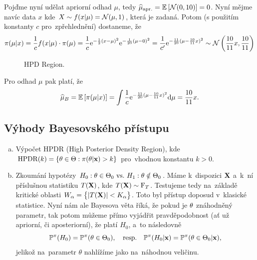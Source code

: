 \begin{example}
\begin{enumerate}[a)]
	
	Pojďme nyní udělat apriorní odhad $\mu$, tedy $\widehat{\mu}_{\mathrm{apr.}}=\mathbb{E}\left[ \mathcal{N}(0,10) \right]=0$. Nyní mějme navíc data $x$ kde $X\sim f(x|\mu)=\mathcal{N}(\mu,1)$, která je zadaná. Potom (s použitím konstanty $c$ pro~zpřehlednění) dostaneme, že
	$$ \pi(\mu|x)=\frac{1}{c}f(x|\mu)\cdot\pi(\mu)=\frac{1}{c}\mathrm{e}^{-\frac{1}{2}(x-\mu)^2}\mathrm{e}^{-\frac{1}{20}(\mu-0)^2}=\frac{1}{c'}\mathrm{e}^{-\frac{11}{20}(\mu-\frac{10}{11}x)^2}\sim \mathcal{N}\left(\frac{10}{11}x,\frac{10}{11}\right)$$ 	\begin{figure}[h]
		\centering
		\caption{HPD Region.}
	\end{figure}

	Pro odhad $\mu$ pak platí, že
	$$\widehat{\mu}_B=\mathbb{E}\left[ \pi(\mu|x) \right]=\int\frac{1}{c}\mathrm{e}^{-\frac{11}{20}(\mu-\frac{10}{11}x)^2}\mathrm{d}\mu=\frac{10}{11}x.$$ 
		\end{enumerate}
\end{example}

	\subsection*{Výhody Bayesovského přístupu}
\begin{enumerate}[a)]
	\item Výpočet HPDR (High Posterior Density Region), kde $\mathrm{HPDR}(k)=\{\theta\in\Theta:\pi(\theta|\textbf{x})>k\}$ pro~vhodnou konstantu $k>0$.


	
	\item Zkoumání hypotézy $H_0: \theta\in\Theta_0 ~\text{vs.}~ H_1: \theta\notin\Theta_0$. Máme k~dispozici $\textbf{X}$ a~k~ní příslušnou statistiku $T(\textbf{X})$, kde $T(\textbf{X})\sim\mathrm{F}_T$. Testujeme tedy na~základě kritické oblasti $W_\alpha=\big\{ |T(\textbf{X})|<K_\alpha \big\}$. Toto byl přístup doposud v~klasické statistice. Nyní nám ale Bayesova věta říká, že pokud je $\theta$ znáhodněný parametr, tak potom můžeme přímo vyjádřit pravděpodobnost (ať už apriorní, či aposteriorní), že platí $H_0$, a~to následovně
	$$\mathbb{P}^\pi(H_0) = \mathbb{P}^\pi(\theta \in \Theta_0),\quad\text{resp.}\quad \mathbb{P}^\pi(H_0|\textbf{x})=\mathbb{P}^\pi(\theta\in\Theta_0|\textbf{x}),$$
	jelikož na~parametr $\theta$ nahlížíme jako na~náhodnou veličinu.

\end{enumerate}


